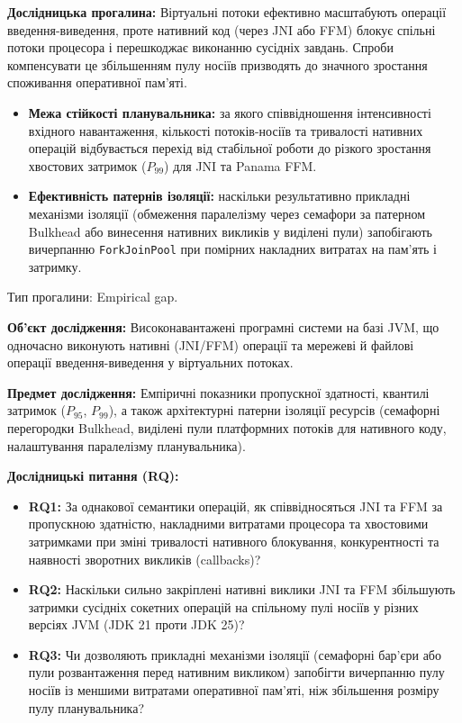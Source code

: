 \textbf{Дослідницька прогалина:} Віртуальні потоки ефективно масштабують операції введення-виведення, проте нативний код (через JNI або FFM) блокує спільні потоки процесора і перешкоджає виконанню сусідніх завдань. Спроби компенсувати це збільшенням пулу носіїв призводять до значного зростання споживання оперативної пам'яті.
\begin{itemize}[wide]
    \item \textbf{Межа стійкості планувальника:} за якого співвідношення інтенсивності вхідного навантаження, кількості потоків-носіїв та тривалості нативних операцій відбувається перехід від стабільної роботи до різкого зростання хвостових затримок ($P_{99}$) для JNI та Panama FFM.
    \item \textbf{Ефективність патернів ізоляції:} наскільки результативно прикладні механізми ізоляції (обмеження паралелізму через семафори за патерном \foreignlanguage{english}{Bulkhead} або винесення нативних викликів у виділені пули) запобігають вичерпанню \texttt{ForkJoinPool} при помірних накладних витратах на пам'ять і затримку.
\end{itemize}
Тип прогалини: Empirical gap.

\textbf{Об'єкт дослідження:} Високонавантажені програмні системи на базі JVM, що одночасно виконують нативні (JNI/FFM) операції та мережеві й файлові операції введення-виведення у віртуальних потоках.

\textbf{Предмет дослідження:} Емпіричні показники пропускної здатності, квантилі затримок ($P_{95}$, $P_{99}$), а також архітектурні патерни ізоляції ресурсів (семафорні перегородки Bulkhead, виділені пули платформних потоків для нативного коду, налаштування паралелізму планувальника).

\textbf{Дослідницькі питання (RQ):}
\begin{itemize}[wide]
    \item \textbf{RQ1:} За однакової семантики операцій, як співвідносяться JNI та FFM за пропускною здатністю, накладними витратами процесора та хвостовими затримками при зміні тривалості нативного блокування, конкурентності та наявності зворотних викликів (callbacks)?
    \item \textbf{RQ2:} Наскільки сильно закріплені нативні виклики JNI та FFM збільшують затримки сусідніх сокетних операцій на спільному пулі носіїв у різних версіях JVM (JDK 21 проти JDK 25)?
    \item \textbf{RQ3:} Чи дозволяють прикладні механізми ізоляції (семафорні бар'єри або пули розвантаження перед нативним викликом) запобігти вичерпанню пулу носіїв із меншими витратами оперативної пам'яті, ніж збільшення розміру пулу планувальника?
\end{itemize}

